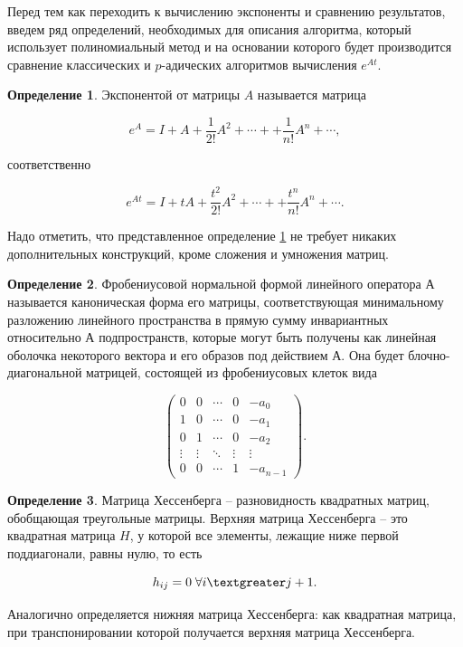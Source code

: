 \documentclass[master, och, diploma, times]{sty/SCWorks}
\theoremstyle{plain}
\theoremstyle{definition}
\newtheorem{defn}{Определение}[section]
\numberwithin{equation}{section}
\begin{document}
Перед тем как переходить к вычислению экспоненты и сравнению результатов, введем ряд определений, необходимых для описания алгоритма, который использует полиномиальный метод и на основании которого будет производится сравнение классических и $p$-адических алгоритмов вычисления $e^{At}$.

\begin{defn}\label{def:exp}
Экспонентой от матрицы $A$ называется матрица

\begin{equation}
e^A=I+A+\frac{1}{2!}A^2+\cdots++\frac{1}{n!}A^n + \cdots,
\end{equation}

\noindent соответственно

\begin{equation}
e^{At}=I+tA+\frac{t^2}{2!}A^2+\cdots++\frac{t^n}{n!}A^n + \cdots.
\end{equation}
\end{defn}

Надо отметить, что представленное определение \ref{def:exp} не требует никаких дополнительных конструкций, кроме сложения и умножения матриц. 

\begin{defn}
Фробениусовой нормальной формой линейного оператора $А$ называется каноническая форма его матрицы, соответствующая минимальному разложению линейного пространства в прямую сумму инвариантных относительно $А$ подпространств, которые могут быть получены как линейная оболочка некоторого вектора и его образов под действием $А$. Она будет блочно-диагональной матрицей, состоящей из фробениусовых клеток вида

\begin{equation}
\begin{pmatrix}
0&0&\cdots&0&-a_0\\
1&0&\cdots&0&-a_1\\
0&1&\cdots&0&-a_2\\
\vdots&\vdots&\ddots&\vdots&\vdots\\
0&0&\cdots&1&-a_{n-1}
\end{pmatrix}.
\end{equation}

\end{defn}

\begin{defn}
Матрица Хессенберга -- разновидность квадратных матриц, обобщающая треугольные матрицы. Верхняя матрица Хессенберга -- это квадратная матрица ${\displaystyle H}$, у которой все элементы, лежащие ниже первой поддиагонали, равны нулю, то есть 

\begin{equation}
h_{ij}=0 \; \forall i \textgreater j+1.	
\end{equation}

\noindent Аналогично определяется нижняя матрица Хессенберга: как квадратная матрица, при транспонировании которой получается верхняя матрица Хессенберга\cite{bib:ode:1}.
\end{defn}
\end{document}
